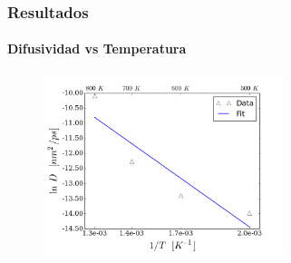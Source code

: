 \begin{frame}
 \frametitle{Resultados}
 \framesubtitle{Difusividad vs Temperatura}
 \vspace{0.5cm}
 \begin{figure}
   \centering
   \includegraphics[width=7cm]{../Figures/Cap_4/FCCDiff_vs_temp_fit.png}
  \end{figure}
\end{frame}

